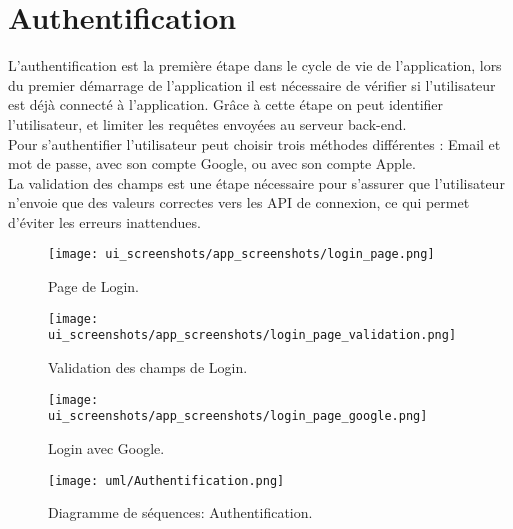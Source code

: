 \section{Authentification}
L'authentification est la première étape dans le cycle de vie de l'application, lors du premier démarrage de l'application il est nécessaire de vérifier si l'utilisateur est déjà connecté à l'application. Grâce à cette étape on peut identifier l'utilisateur, et limiter les requêtes envoyées au serveur back-end.\\
\noindent Pour s'authentifier l'utilisateur peut choisir trois méthodes différentes : Email et mot de passe, avec son compte Google, ou avec son compte Apple.\\
La validation des champs est une étape nécessaire pour s'assurer que l'utilisateur n'envoie que des valeurs correctes vers les API de connexion, ce qui permet d'éviter les erreurs inattendues.
\vspace{.5cm}
\begin{center}
    \begin{multicols}{2}
        \begin{figure}[H]
            \centering
            \texttt{[image: ui\_screenshots/app\_screenshots/login\_page.png]}
            \vspace{.5cm}
            \caption{Page de Login.}
            \label{fig:app_login}
        \end{figure}
        \begin{figure}[H]
            \centering
            \texttt{[image: ui\_screenshots/app\_screenshots/login\_page\_validation.png]}
            \vspace{.5cm}
            \caption{Validation des champs de Login.}
            \label{fig:app_login_validation}
        \end{figure}
    \end{multicols}
\end{center}

\begin{center}
    \begin{figure}[H]
        \centering
        \texttt{[image: ui\_screenshots/app\_screenshots/login\_page\_google.png]}
        \vspace{.5cm}
        \caption{Login avec Google.}
        \label{fig:app_login_google}
    \end{figure}
\end{center}
\vspace{1cm}
\begin{figure}[H]
    \centering
    \texttt{[image: uml/Authentification.png]}
    \vspace{.5cm}
    \caption{Diagramme de séquences: Authentification.}
    \label{fig:seq_auth}
\end{figure}
